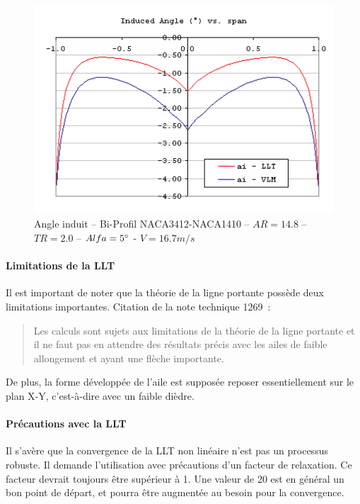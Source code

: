 \documentclass[a4paper,twoside,12pt,dvips]{article}
\begin{document}
\begin{figure}[htbp]
	\centering
	\includegraphics[width=0.8\linewidth]{img-16}
	\caption{Angle induit – Bi-Profil NACA3412-NACA1410 – $AR = 14.8$ – $TR =
	2.0$ – $Alfa = 5\degree$ - $V= 16.7m/s$}
	\label{img:angle_induit}
\end{figure}


\paragraph{Limitations de la LLT}

Il est important de noter que la théorie de la ligne portante possède deux 
limitations importantes. Citation de la note technique 1269\cite{Sivells47}~: 

\begin{quotation}
  Les calculs sont sujets aux limitations de la théorie de la ligne portante
  et il ne faut pas en attendre des résultats précis avec les ailes de
  faible allongement et ayant une flèche importante.
\end{quotation}

De plus, la forme développée de l’aile est supposée reposer essentiellement 
sur le plan X-Y, c’est-à-dire avec un faible dièdre. 

\paragraph{Précautions avec la LLT}

Il s’avère que la convergence de la LLT non linéaire n’est pas un processus 
robuste. Il demande l’utilisation avec précautions d’un facteur de
relaxation. Ce facteur devrait toujours être supérieur à 1. Une valeur de
20 est en général un bon point de départ, et pourra être augmentée au besoin
pour la convergence.
\end{document}
